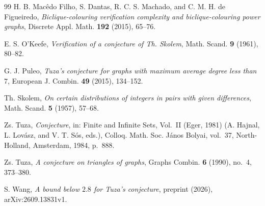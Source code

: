 \documentclass{amsart}
\theoremstyle{definition}
\theoremstyle{remark}
\numberwithin{equation}{section}
\numberwithin{table}{section}
\begin{document}
\begin{thebibliography}{99}
H. B. Mac\^edo Filho, S. Dantas, R. C. S. Machado, and C. M. H. de Figueiredo, \emph{Biclique-colouring verification complexity and biclique-colouring power graphs}, Discrete Appl. Math. \textbf{192} (2015), 65--76.

E. S. O'Keefe, \emph{Verification of a conjecture of Th. Skolem}, Math. Scand. \textbf{9} (1961), 80--82.

G. J. Puleo, \emph{Tuza's conjecture for graphs with maximum average degree less than $7$}, European J. Combin. \textbf{49} (2015), 134--152.

Th. Skolem, \emph{On certain distributions of integers in pairs with given differences}, Math. Scand. \textbf{5} (1957), 57--68.

Zs. Tuza, \emph{Conjecture}, in: Finite and Infinite Sets, Vol.~II (Eger, 1981) (A. Hajnal, L. Lov\'asz, and V. T. S\'os, eds.), Colloq. Math. Soc. J\'anos Bolyai, vol.~37, North-Holland, Amsterdam, 1984, p.~888.

Zs. Tuza, \emph{A conjecture on triangles of graphs}, Graphs Combin. \textbf{6} (1990), no.~4, 373--380.

S. Wang, \emph{A bound below $2.8$ for Tuza's conjecture}, preprint (2026), arXiv:2609.13831v1.

\end{thebibliography}
\end{document}
